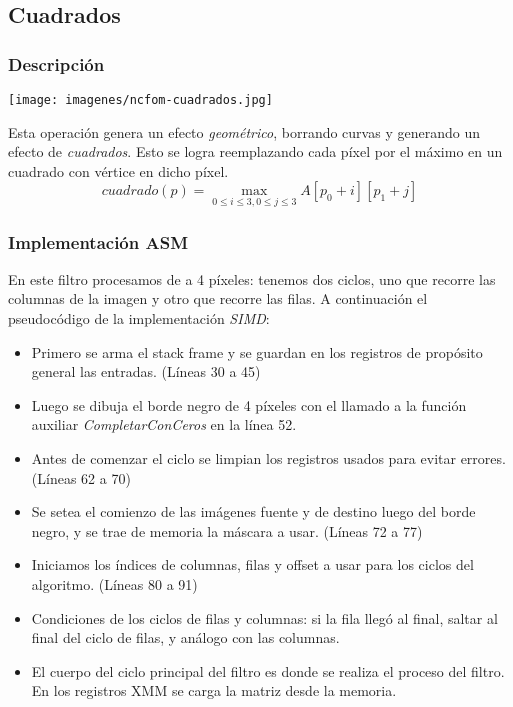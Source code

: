 \subsection{Cuadrados}

\subsubsection{Descripción}

\begin{center}
	\texttt{[image: imagenes/ncfom-cuadrados.jpg]}
\end{center}

Esta operación genera un efecto \textit{geométrico}, borrando curvas y generando un efecto de \textit{cuadrados}. Esto se logra reemplazando cada píxel por el máximo en un cuadrado con vértice en dicho píxel.
\[cuadrado(p) = \underset{0\leq i \leq 3, 0 \leq j \leq 3}{\max} A[p_0+i][p_1+j] \]

\subsubsection{Implementación ASM}

En este filtro procesamos de a 4 píxeles: tenemos dos ciclos, uno que recorre las columnas de la imagen y otro que recorre las filas. A continuación el pseudocódigo de la implementación \textit{SIMD}:

\begin{itemize}

\item Primero se arma el stack frame y se guardan en los registros de propósito general las entradas. (Líneas 30 a 45)
\item Luego se dibuja el borde negro de 4 píxeles con el llamado a la función auxiliar \textit{CompletarConCeros} en la línea 52.
\item Antes de comenzar el ciclo se limpian los registros usados para evitar errores. (Líneas 62 a 70)
\item Se setea el comienzo de las imágenes fuente y de destino luego del borde negro, y se trae de memoria la máscara a usar. (Líneas 72 a 77)
\item Iniciamos los índices de columnas, filas y offset a usar para los ciclos del algoritmo. (Líneas 80 a 91)
\item Condiciones de los ciclos de filas y columnas: si la fila llegó al final, saltar al final del ciclo de filas, y análogo con las columnas.
\item El cuerpo del ciclo principal del filtro es donde se realiza el proceso del filtro. En los registros XMM se carga la matriz desde la memoria.
\end{itemize}

